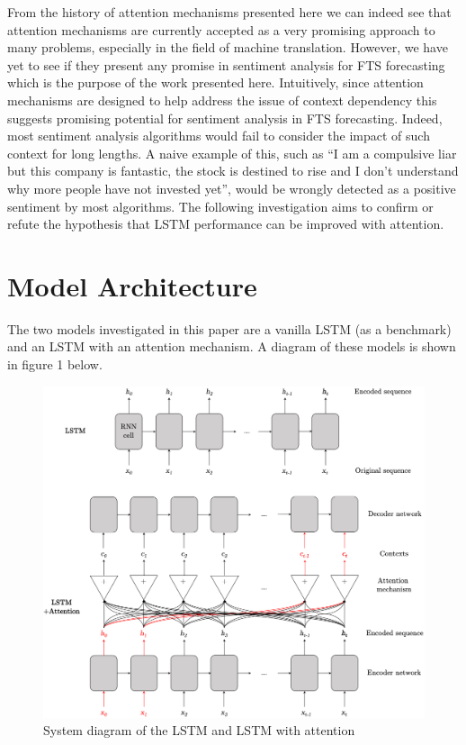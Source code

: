 \documentclass{article}
\begin{document}
From the history of attention mechanisms presented here we can indeed see that attention mechanisms are currently accepted as a very promising approach to many problems, especially in the field of machine translation. However, we have yet to see if they present any promise in sentiment analysis for FTS forecasting which is the purpose of the work presented here. Intuitively, since attention mechanisms are designed to help address the issue of context dependency this suggests promising potential for sentiment analysis in FTS forecasting. Indeed, most sentiment analysis algorithms would fail to consider the impact of such context for long lengths. A naive example of this, such as “I am a compulsive liar but this company is fantastic, the stock is destined to rise and I don’t understand why more people have not invested yet”, would be wrongly detected as a positive sentiment by most algorithms. The following investigation aims to confirm or refute the hypothesis that LSTM performance can be improved with attention. 

\section{Model Architecture}

The two models investigated in this paper are a vanilla LSTM (as a benchmark) and an LSTM with an attention mechanism. A diagram of these models is shown in figure 1 below. 

\begin{figure}[!h]
	\includegraphics[width=375pt]{Diagram.png}
	\caption{System diagram of the LSTM and LSTM with attention}
\end{figure}
\end{document}
